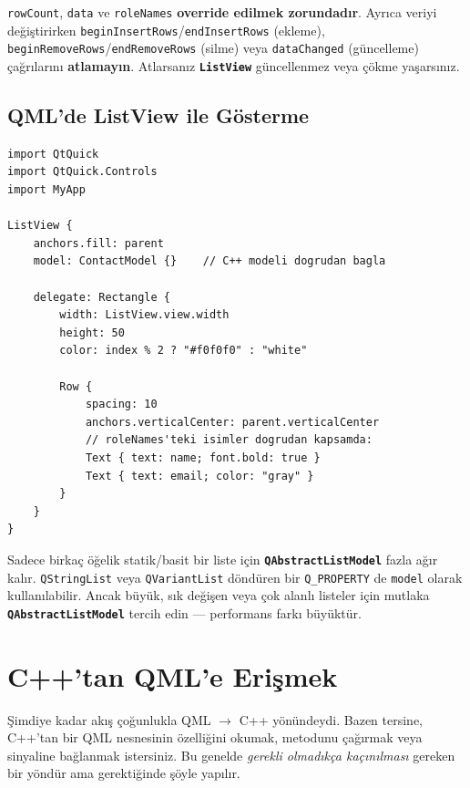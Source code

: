 \documentclass[11pt,a4paper]{article}
\newcommand{\kls}[1]{\texttt{\color{anaMavi}\textbf{#1}}}
\newcommand{\kod}[1]{\texttt{\color{koyuGri}#1}}
\begin{document}
\begin{uyarikutu}
\kod{rowCount}, \kod{data} ve \kod{roleNames} \textbf{override edilmek zorundadır}.
Ayrıca veriyi değiştirirken \kod{beginInsertRows}/\kod{endInsertRows} (ekleme),
\kod{beginRemoveRows}/\kod{endRemoveRows} (silme) veya \kod{dataChanged} (güncelleme)
çağrılarını \textbf{atlamayın}. Atlarsanız \kls{ListView} güncellenmez veya
çökme yaşarsınız.
\end{uyarikutu}

\subsection{QML'de ListView ile Gösterme}

\begin{lstlisting}[style=qmlstyle]
import QtQuick
import QtQuick.Controls
import MyApp

ListView {
    anchors.fill: parent
    model: ContactModel {}    // C++ modeli dogrudan bagla

    delegate: Rectangle {
        width: ListView.view.width
        height: 50
        color: index % 2 ? "#f0f0f0" : "white"

        Row {
            spacing: 10
            anchors.verticalCenter: parent.verticalCenter
            // roleNames'teki isimler dogrudan kapsamda:
            Text { text: name; font.bold: true }
            Text { text: email; color: "gray" }
        }
    }
}
\end{lstlisting}

\begin{notkutu}
Sadece birkaç öğelik statik/basit bir liste için \kls{QAbstractListModel}
fazla ağır kalır. \kod{QStringList} veya \kod{QVariantList} döndüren bir
\kod{Q\_PROPERTY} de \kod{model} olarak kullanılabilir. Ancak büyük, sık
değişen veya çok alanlı listeler için mutlaka \kls{QAbstractListModel} tercih
edin — performans farkı büyüktür.
\end{notkutu}

\section{C++'tan QML'e Erişmek}

Şimdiye kadar akış çoğunlukla QML $\rightarrow$ C++ yönündeydi. Bazen tersine,
C++'tan bir QML nesnesinin özelliğini okumak, metodunu çağırmak veya sinyaline
bağlanmak istersiniz. Bu genelde \emph{gerekli olmadıkça kaçınılması} gereken
bir yöndür ama gerektiğinde şöyle yapılır.
\end{document}
